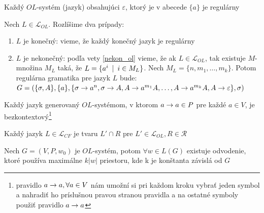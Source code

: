 \begin{veta}
Každý $OL$-systém (jazyk) obsahujúci $\varepsilon$, ktorý je v
abecede $\{a\}$ je regulárny
\end{veta}

\begin{dokaz}
Nech $L\in\mathcal{L}_{OL}$. Rozlíšime dva prípady:
\begin{enumerate}
\item $L$ je konečný: vieme, že každý konečný jazyk je regulárny
\item $L$ je nekonečný: podľa vety \ref{nekon_ol} vieme, že ak
$L\in\mathcal{L}_{OL}$, tak existuje $M$-množina $M_L$ taká, že
$L=\{a^i\enspace |\enspace i\in M_L\}$. Nech $M_L=\{n,m_1,\dots,m_k\}$. Potom
regulárna gramatika pre jazyk $L$ bude:
$G=(\{\sigma,A\},\{a\},\{\sigma\rightarrow a^n,\sigma\rightarrow A,A\rightarrow
a^{m_1}A,\dots,A\rightarrow a^{m_k}A,A\rightarrow \varepsilon\},\sigma)$
\end{enumerate}
\end{dokaz}

\begin{poznamka}
Každý jazyk generovaný $OL$-systémom, v ktorom $a\rightarrow a\in P$ pre
každé $a\in V$, je bezkontextový\footnote{pravidlo $a\rightarrow a,\forall
a\in V$ nám umožní si pri každom kroku vybrať jeden symbol a
nahradiť ho príslušnou pravou stranou pravidla a na ostatné
symboly použiť pravidlo $a\rightarrow a$}
\end{poznamka}

\begin{poznamka}
Každý jazyk $L\in\mathcal{L}_{CF}$ je tvaru $L'\cap R$ pre
$L'\in\mathcal{L}_{OL},R\in\mathcal{R}$
\end{poznamka}

\begin{lema}
\label{linear} Nech $G=(V,P,w_0)$ je $OL$-systém, potom $\forall
w\in L(G)$ existuje odvodenie, ktoré používa ma\-xi\-mál\-ne
$k|w|$ priestoru, kde k je konštanta závislá od $G$
\end{lema}

